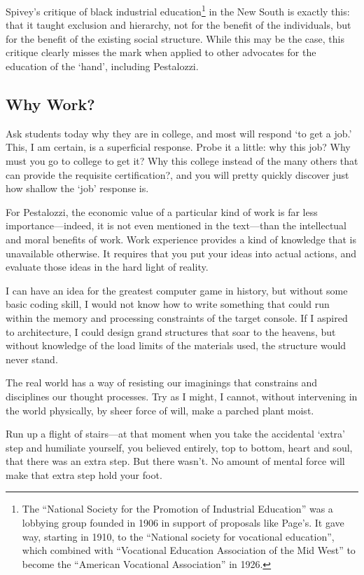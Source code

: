 Spivey's critique of black industrial education\footnote{The ``National Society for the Promotion of Industrial Education'' was a lobbying group founded in 1906 in support of proposals like Page's. It gave way, starting in 1910, to the ``National society for vocational education'', which combined with ``Vocational Education Association of the Mid West'' to become the ``American Vocational Association'' in 1926.} in the New South is exactly this: that it taught exclusion and hierarchy, not for the benefit of the individuals, but for the benefit of the existing social structure. While this may be the case, this critique clearly misses the mark when applied to other advocates for the education of the `hand', including Pestalozzi.

\subsection{Why Work?}
\label{whywork}

Ask students today why they are in college, and most will respond `to get a job.' This, I am certain, is a superficial response. Probe it a little: why this job? Why must you go to college to get it? Why this college instead of the many others that can provide the requisite certification?, and you will pretty quickly discover just how shallow the `job' response is.

For Pestalozzi, the economic value of a particular kind of work is far less importance---indeed, it is not even mentioned in the text---than the intellectual and moral benefits of work. Work experience provides a kind of knowledge that is unavailable otherwise. It requires that you put your ideas into actual actions, and evaluate those ideas in the hard light of reality.

I can have an idea for the greatest computer game in history, but without some basic coding skill, I would not know how to write something that could run within the memory and processing constraints of the target console. If I aspired to architecture, I could design grand structures that soar to the heavens, but without knowledge of the load limits of the materials used, the structure would never stand. 

The real world has a way of resisting our imaginings that constrains and disciplines our thought processes. Try as I might, I cannot, without intervening in the world physically, by sheer force of will, make a parched plant moist. 

Run up a flight of stairs---at that moment when you take the accidental `extra' step and humiliate yourself, you believed entirely, top to bottom, heart and soul, that there was an extra step. But there wasn't. No amount of mental force will make that extra step hold your foot.

